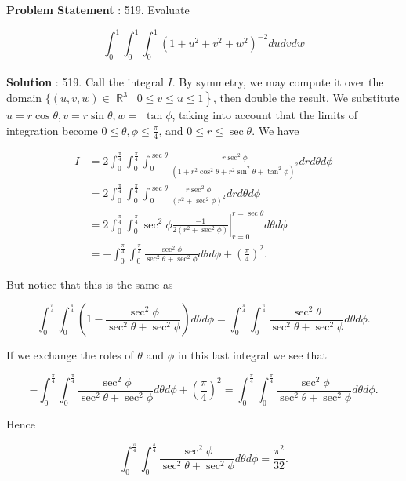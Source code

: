 \documentclass[10pt]{article}
\begin{document}
\textbf{Problem Statement} :
519. Evaluate

$$
\int_{0}^{1} \int_{0}^{1} \int_{0}^{1}\left(1+u^{2}+v^{2}+w^{2}\right)^{-2} d u d v d w
$$
\\
\textbf{Solution} :
519. Call the integral $I$. By symmetry, we may compute it over the domain $\{(u, v, w) \in$ $\left.\mathbb{R}^{3} \mid 0 \leq v \leq u \leq 1\right\}$, then double the result. We substitute $u=r \cos \theta, v=r \sin \theta, w=$ $\tan \phi$, taking into account that the limits of integration become $0 \leq \theta, \phi \leq \frac{\pi}{4}$, and $0 \leq r \leq \sec \theta$. We have

$$
\begin{aligned}
I &=2 \int_{0}^{\frac{\pi}{4}} \int_{0}^{\frac{\pi}{4}} \int_{0}^{\sec \theta} \frac{r \sec ^{2} \phi}{\left(1+r^{2} \cos ^{2} \theta+r^{2} \sin ^{2} \theta+\tan ^{2} \phi\right)^{2}} d r d \theta d \phi \\
&=2 \int_{0}^{\frac{\pi}{4}} \int_{0}^{\frac{\pi}{4}} \int_{0}^{\sec \theta} \frac{r \sec ^{2} \phi}{\left(r^{2}+\sec ^{2} \phi\right)^{2}} d r d \theta d \phi \\
&=\left.2 \int_{0}^{\frac{\pi}{4}} \int_{0}^{\frac{\pi}{4}} \sec ^{2} \phi \frac{-1}{2\left(r^{2}+\sec ^{2} \phi\right)}\right|_{r=0} ^{r=\sec \theta} d \theta d \phi \\
&=-\int_{0}^{\frac{\pi}{4}} \int_{0}^{\frac{\pi}{4}} \frac{\sec ^{2} \phi}{\sec ^{2} \theta+\sec ^{2} \phi} d \theta d \phi+\left(\frac{\pi}{4}\right)^{2} .
\end{aligned}
$$

But notice that this is the same as

$$
\int_{0}^{\frac{\pi}{4}} \int_{0}^{\frac{\pi}{4}}\left(1-\frac{\sec ^{2} \phi}{\sec ^{2} \theta+\sec ^{2} \phi}\right) d \theta d \phi=\int_{0}^{\frac{\pi}{4}} \int_{0}^{\frac{\pi}{4}} \frac{\sec ^{2} \theta}{\sec ^{2} \theta+\sec ^{2} \phi} d \theta d \phi .
$$

If we exchange the roles of $\theta$ and $\phi$ in this last integral we see that

$$
-\int_{0}^{\frac{\pi}{4}} \int_{0}^{\frac{\pi}{4}} \frac{\sec ^{2} \phi}{\sec ^{2} \theta+\sec ^{2} \phi} d \theta d \phi+\left(\frac{\pi}{4}\right)^{2}=\int_{0}^{\frac{\pi}{4}} \int_{0}^{\frac{\pi}{4}} \frac{\sec ^{2} \phi}{\sec ^{2} \theta+\sec ^{2} \phi} d \theta d \phi .
$$

Hence

$$
\int_{0}^{\frac{\pi}{4}} \int_{0}^{\frac{\pi}{4}} \frac{\sec ^{2} \phi}{\sec ^{2} \theta+\sec ^{2} \phi} d \theta d \phi=\frac{\pi^{2}}{32} .
$$
\end{document}
